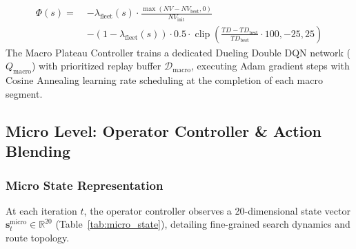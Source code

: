\begin{align}
  \Phi(s) = \; &-\lambda_{\text{fleet}}(s) \cdot \frac{\max(NV - NV_{\text{best}}, 0)}{NV_{\text{init}}} \nonumber \\
  &- (1 - \lambda_{\text{fleet}}(s)) \cdot 0.5 \cdot \operatorname{clip}\left(\frac{TD - TD_{\text{best}}}{TD_{\text{best}}} \cdot 100, -25, 25\right)
  \label{eq:potential_function}
\end{align}
The Macro Plateau Controller trains a dedicated Dueling Double DQN network ($Q_{\text{macro}}$) with prioritized replay buffer $\mathcal{D}_{\text{macro}}$, executing Adam gradient steps with Cosine Annealing learning rate scheduling at the completion of each macro segment.

\subsection{Micro Level: Operator Controller \& Action Blending}
\label{sec:micro_controller}

\subsubsection{Micro State Representation}
At each iteration $t$, the operator controller observes a 20-dimensional state vector $\mathbf{s}_t^{\text{micro}} \in \mathbb{R}^{20}$ (Table~\ref{tab:micro_state}), detailing fine-grained search dynamics and route topology.

